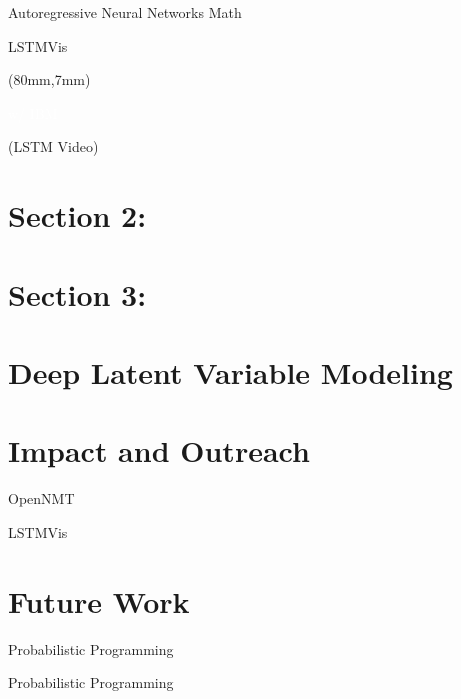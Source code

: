 \documentclass{beamer}
\def\research#1{\begin{textblock*}{50mm}(80mm,7mm)\centerline{\textcolor{white}{ \footnotesize #1}}\end{textblock*}}
\let\realcitet\citet
\renewcommand*{\citet}[1]{{\scriptsize \realcitet{#1}}}
\begin{document}
\begin{frame}{Autoregressive Neural Networks Math}

\end{frame}

\begin{frame}{LSTMVis}
  \research{\citet{Strobelt2016} w/ IBM}

  (LSTM Video)


\end{frame}




\section{Section 2:}
\begin{frame}

\end{frame}

\section{Section 3:}

\section{Deep Latent Variable Modeling}

\begin{frame}

\end{frame}

\begin{frame}

\end{frame}

\begin{frame}

\end{frame}

\section{Impact and Outreach}

\begin{frame}{OpenNMT}

\end{frame}

\begin{frame}{LSTMVis}

\end{frame}



\section{Future Work}

\begin{frame}{Probabilistic Programming}

\end{frame}

\begin{frame}{Probabilistic Programming}

\end{frame}


\begin{frame}

\end{frame}



\end{document}
